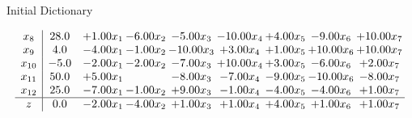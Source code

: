 \documentclass[8pt]{article}
\begin{document}
Initial Dictionary 

\[\begin{array}{c| c c@{\hskip 2pt} c@{\hskip 2pt} c@{\hskip 2pt} c@{\hskip 2pt} c@{\hskip 2pt} c@{\hskip 2pt} c@{\hskip 2pt} }
 x_{8}   &  28.0 & +  1.00 x_{1} & -6.00 x_{2} & -5.00 x_{3} & -10.00 x_{4} & +  4.00 x_{5} & -9.00 x_{6} & + 10.00 x_{7}\\
 x_{9}   &  4.0 & -4.00 x_{1} & -1.00 x_{2} & -10.00 x_{3} & +  3.00 x_{4} & +  1.00 x_{5} & + 10.00 x_{6} & + 10.00 x_{7}\\
 x_{10}   &  -5.0 & -2.00 x_{1} & -2.00 x_{2} & -7.00 x_{3} & + 10.00 x_{4} & +  3.00 x_{5} & -6.00 x_{6} & +  2.00 x_{7}\\
 x_{11}   &  50.0 & +  5.00 x_{1} &   & -8.00 x_{3} & -7.00 x_{4} & -9.00 x_{5} & -10.00 x_{6} & -8.00 x_{7}\\
 x_{12}   &  25.0 & -7.00 x_{1} & -1.00 x_{2} & +  9.00 x_{3} & -1.00 x_{4} & -4.00 x_{5} & -4.00 x_{6} & +  1.00 x_{7}\\
\hline
z    &  0.0 & -2.00 x_{1} & -4.00 x_{2} & +  1.00 x_{3} & +  1.00 x_{4} & +  4.00 x_{5} & +  1.00 x_{6} & +  1.00 x_{7}\\
\end{array}\]
\end{document}
